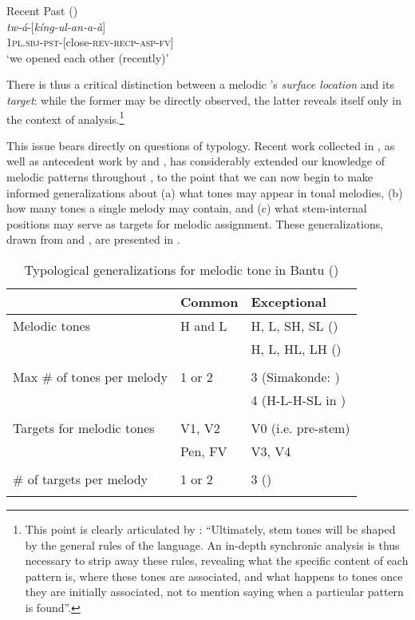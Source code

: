 \documentclass[output=paper,newtxmath,modfonts,nonflat,draft]{langsci/langscibook}
\begin{document}
\ea\label{ex:jones:2}
Recent Past ()\\
\gll \textit{tw-á}-[\textit{kíng-ul-an-a-à}] \\
\textsc{1pl.sbj-pst-[}close\textsc{-rev-recp-asp-fv]}\\
\glt ‘we opened each other (recently)’
\z

\newpage 
\noindent 
There is thus a critical distinction between a melodic ’s \textit{surface location} and its \textit{target}: while the former may be directly observed, the latter reveals itself only in the context of analysis.\footnote{This point is clearly articulated by \citet[5]{Bickmore2014}: “Ultimately, stem tones will be shaped by the general rules of the language. An in-depth synchronic analysis is thus necessary to strip away these rules, revealing what the specific content of each pattern is, where these tones are associated, and what happens to tones once they are initially associated, not to mention saying when a particular pattern is found”.}

This issue bears directly on questions of typology. Recent work collected in  \citet{Bickmore2014}, as well as antecedent work by \citet{Kisseberth&Odden2003} and \citet{Marlo2013}, has considerably extended our knowledge of melodic  patterns throughout , to the point that we can now begin to make informed generalizations about (a) what tones may appear in tonal melodies, (b) how many tones a single melody may contain, and (c) what stem-internal positions may serve as targets for melodic assignment. These generalizations, drawn from \citet{Bickmore2014} and \citet{Bickmore2015}, are presented in .

\begin{table}
\begin{tabularx}{\textwidth}{lQl}
\lsptoprule
	&  Common  &  Exceptional\\
\midrule
{Melodic tones} 	& H and L &  {H, L, SH, SL ()}  \\
					& 		  &   H, L, HL, LH  ()\\
                    & & \\
 Max \# of tones per melody & 1 or 2 & {3 (Simakonde: \citealt{Manus2014})}\\
 &  & 4 (H-L-H-SL in )\\
 & & \\
{Targets for melodic tones} & {V1,  V2}  & {V0 (i.e. pre-stem)}\\
  & Pen, FV   & V3,  V4\\
& & \\
{ \# of targets per melody} & 1 or 2 & 3 ()\\
\lspbottomrule 
\end{tabularx}
\caption{Typological generalizations for melodic tone in Bantu (\citealt{Bickmore2014,Bickmore2015}) }
\label{tab:jones:1}
\end{table}
\end{document}
